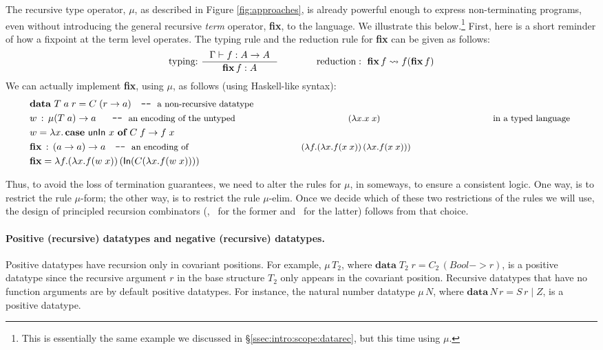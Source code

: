 The recursive type operator, $\mu$, as described in Figure \ref{fig:approaches},
is already powerful enough to express non-terminating programs, even without
introducing the general recursive {\em term} operator, \textbf{fix},
to the language. We illustrate this below.\footnote{This is essentially
        the same example we discussed in \S\ref{ssec:intro:scope:datarec},
        but this time using $\mu$.}
First, here is a short reminder of how a fixpoint at the term level operates.
The typing rule and the reduction rule for \textbf{fix} can be given as follows:
\[ \text{typing:}~ \inference{\Gamma |- f : A -> A}{\textbf{fix}\,f : A}
 \qquad\qquad
   \text{reduction}:~ \textbf{fix}\,f \rightsquigarrow f(\textbf{fix}\,f)
\]
We can actually implement \textbf{fix}, using $\mu$, as follows
(using Haskell-like syntax):
\begin{align*}
& \textbf{data}~T\;a\;r = C\;(r -> a) \quad
          \texttt{-}\texttt{-}~\text{\small a non-recursive datatype} \\
& w \,:\, \mu(T\;a) -> a ~~ \quad
          \texttt{-}\texttt{-}~\text{\small an encoding of the untyped
                                     $(\lambda x.x\;x)$
                                     in a typed language}~ \\
& w = \lambda x . \,\textbf{case}~\mathsf{unIn}~x~\textbf{of}~C\;f -> f\;x \\
& \textbf{fix} \,:\, (a -> a) -> a \quad
          \texttt{-}\texttt{-}~\text{\small an encoding of 
                                     $(\lambda f.(\lambda x.f(x\;x))\,
                                                 (\lambda x.f(x\;x)))$} \\
& \textbf{fix} = \lambda f. (\lambda x. f (w\;x))\,(\mathsf{In}(C(\lambda x. f (w\;x))))
\end{align*}

Thus, to avoid the loss of termination guarantees, we need to alter the rules
for $\mu$, in someways, to ensure a consistent logic. One way, is to restrict
the rule {\small $\mu$-form}; the other way, is to restrict the rule
{\small $\mu$-elim}. Once we decide which of these two restrictions of the
rules we will use, the design of principled recursion combinators (\eg, \It\
for the former and \MIt\ for the latter) follows from that choice.

\paragraph{Positive (recursive) datatypes and negative (recursive) datatypes.}
Positive datatypes have recursion only in covariant positions.
For example, $\mu\,T_2$, where $\textbf{data}\;T_2 \; r = C_2\,(Bool -> r)$,
is a positive datatype since the recursive argument $r$ in
the base structure $T_2$ only appears in the covariant position.
Recursive datatypes that have no function arguments are by default
positive datatypes. For instance, the natural number datatype $\mu\,N$,
where $\textbf{data}\,N\,r=S\,r \mid Z$, is a positive datatype.

